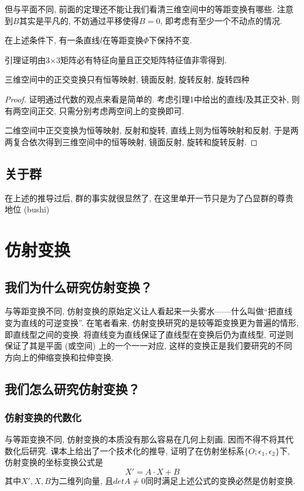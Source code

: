 \documentclass[./main.tex]{subfiles}
\begin{document}
但与平面不同, 前面的定理还不能让我们看清三维空间中的等距变换有哪些. 注意到$B$其实是平凡的, 不妨通过平移使得$B=0$, 即考虑有至少一个不动点的情况. 
\begin{lemma}
    在上述条件下, 有一条直线$l$在等距变换$\Phi$下保持不变. 
\end{lemma}
引理证明由3×3矩阵必有特征向量且正交矩阵特征值非零得到. 
\begin{theorem}
    三维空间中的正交变换只有恒等映射, 镜面反射, 旋转反射, 旋转四种
\end{theorem}
\begin{proof}
    证明通过代数的观点来看是简单的. 考虑引理1中给出的直线$l$及其正交补, 则有两空间正交, 只需分别考虑两空间上的变换即可. 

    二维空间中正交变换为恒等映射, 反射和旋转, 直线上则为恒等映射和反射. 于是两两复合依次得到三维空间中的恒等映射, 镜面反射, 旋转和旋转反射. 
\end{proof}
\subsection{关于群}
在上述的推导过后, 群的事实就很显然了, 在这里单开一节只是为了凸显群的尊贵地位 (bushi) 
\section{仿射变换}
\subsection{我们为什么研究仿射变换？}
与等距变换不同, 仿射变换的原始定义让人看起来一头雾水——什么叫做``把直线变为直线的可逆变换''. 在笔者看来, 仿射变换研究的是较等距变换更为普遍的情形, 即直线型之间的变换. 将直线变为直线保证了直线型在变换后仍为直线型, 可逆则保证了其是平面 (或空间) 上的一个一一对应, 这样的变换正是我们要研究的不同方向上的伸缩变换和拉伸变换. 
\subsection{我们怎么研究仿射变换？}
\subsubsection{仿射变换的代数化}
与等距变换不同, 仿射变换的本质没有那么容易在几何上刻画, 因而不得不将其代数化后研究. 课本上给出了一个技术化的推导, 证明了在仿射坐标系$\{O;\epsilon_1,\epsilon_2\}$下, 仿射变换的坐标变换公式是
\[
X'=A\cdot X +B 
\]
其中$X',X,B$为二维列向量, 且$detA\not=0$同时满足上述公式的变换必然是仿射变换. 
\end{document}
